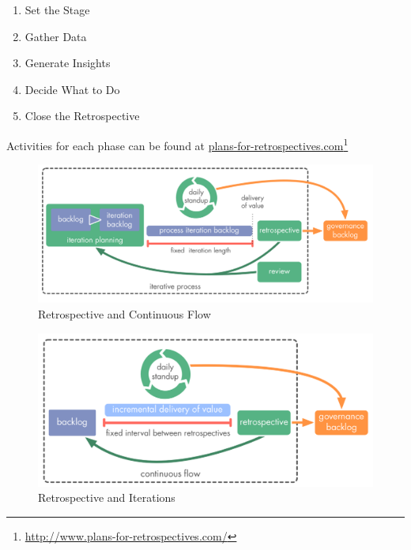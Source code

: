\begin{enumerate}
\item Set the Stage

\item Gather Data

\item Generate Insights

\item Decide What to Do

\item Close the Retrospective

\end{enumerate}

Activities for each phase can be found at \href{http://www.plans-for-retrospectives.com/}{plans-for-retrospectives.com}\footnote{\href{http://www.plans-for-retrospectives.com/}{http:/\slash www.plans-for-retrospectives.com\slash }}

\begin{figure}[htbp]
\centering
\includegraphics[keepaspectratio,width=\textwidth,height=0.75\textheight]{img/meetings/iterations.png}
\caption{Retrospective and Continuous Flow}
\end{figure}

\begin{figure}[htbp]
\centering
\includegraphics[keepaspectratio,width=\textwidth,height=0.75\textheight]{img/meetings/continuous-flow.png}
\caption{Retrospective and Iterations}
\end{figure}

